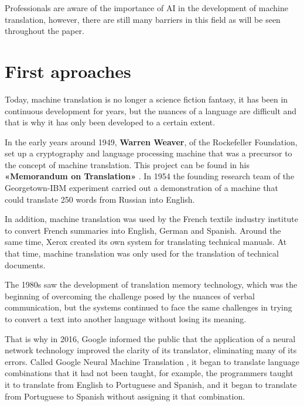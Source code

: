 \documentclass[a4paper]{article}
\theoremstyle{plain}
\theoremstyle{definition}
\begin{document}
    Professionals are aware of the importance of AI in the development of machine translation, however, there are still many barriers in this field as will be seen throughout the paper.


	
	
    
	
	


	
	
	\section{First aproaches}
	\label{sec:examples}
Today, machine translation is no longer a science fiction fantasy, it has been in continuous development for years, but the nuances of a language are difficult and that is why it has only been developed to a certain extent.
	
In the early years around 1949, \textbf{Warren Weaver}, of the Rockefeller Foundation, set up a cryptography and language processing machine that was a precursor to the concept of machine translation. This project can be found in his \textbf{«Memorandum on Translation»} .
In 1954 the founding research team of the Georgetown-IBM experiment carried out a demonstration of a machine that could translate 250 words from Russian into English.

In addition, machine translation was used by the French textile industry institute to convert French summaries into English, German and Spanish. Around the same time, Xerox created its own system for translating technical manuals. At that time, machine translation was only used for the translation of technical documents.

The 1980s saw the development of translation memory technology, which was the beginning of overcoming the challenge posed by the nuances of verbal communication, but the systems continued to face the same challenges in trying to convert a text into another language without losing its meaning.

That is why in 2016, Google informed the public that the application of a neural network technology improved the clarity of its translator, eliminating many of its errors. Called Google Neural Machine Translation , it began to translate language combinations that it had not been taught, for example, the programmers taught it to translate from English to Portuguese and Spanish, and it began to translate from Portuguese to Spanish without assigning it that combination.
\end{document}
